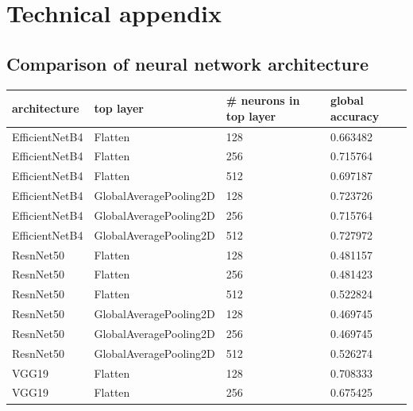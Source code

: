 \documentclass[]{interact}
\theoremstyle{plain}%
\theoremstyle{definition}
\theoremstyle{remark}
\begin{document}



\clearpage

\appendix
\section{Technical appendix}
\label{sec:appendix}

\subsection{Comparison of neural network architecture}
\label{sec:appendixA}

\begin{table}
    \centering
\begin{tabular}{llll}
    \toprule
    architecture & top layer & \# neurons in top layer &       global accuracy \\
    \midrule
    EfficientNetB4 &   Flatten &                    128 &  0.663482 \\
    EfficientNetB4 &   Flatten &                    256 &  0.715764 \\
    EfficientNetB4 &   Flatten &                    512 &  0.697187 \\
    EfficientNetB4 &   GlobalAveragePooling2D &                    128 &  0.723726 \\
    EfficientNetB4 &   GlobalAveragePooling2D &                    256 &  0.715764 \\
    EfficientNetB4 &   GlobalAveragePooling2D &                    512 &  0.727972 \\
        ResnNet50 &   Flatten &                    128 &  0.481157 \\
        ResnNet50 &   Flatten &                    256 &  0.481423 \\
        ResnNet50 &   Flatten &                    512 &  0.522824 \\
        ResnNet50 &   GlobalAveragePooling2D &                    128 &  0.469745 \\
        ResnNet50 &   GlobalAveragePooling2D &                    256 &  0.469745 \\
        ResnNet50 &   GlobalAveragePooling2D &                    512 &  0.526274 \\
           VGG19 &   Flatten &                    128 &  0.708333 \\
           VGG19 &   Flatten &                    256 &  0.675425 \\

\end{tabular}
\end{table}
\end{document}

